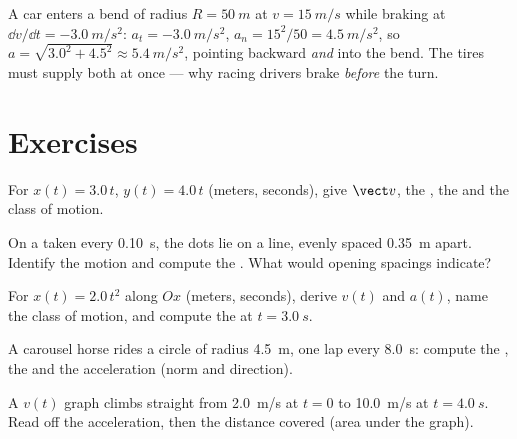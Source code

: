 \begin{example}\label{ex:g12:kinematics-2d:bend}
A car enters a bend of radius $R = \qty{50}{m}$ at $v = \qty{15}{m/s}$
while braking at $\dd v/\dd t = \qty{-3.0}{m/s^2}$: $a_t =
\qty{-3.0}{m/s^2}$, $a_n = 15^2/50 = \qty{4.5}{m/s^2}$, so $a =
\sqrt{3.0^2 + 4.5^2} \approx \qty{5.4}{m/s^2}$, pointing backward
\emph{and} into the bend. The tires must supply both at once ---
why racing drivers brake \emph{before} the turn.
\end{example}

\section{Exercises}

\begin{exercise}[$\star$]\label{exo:g12:kinematics-2d:1}
For $x(t) = 3.0\,t$, $y(t) = 4.0\,t$ (meters, seconds), give
$\vect v$, the , the  and the class of motion.
\end{exercise}

\begin{exercise}[$\star$]\label{exo:g12:kinematics-2d:2}
On a  taken every \qty{0.10}{s}, the dots lie on a
line, evenly spaced \qty{0.35}{m} apart. Identify the motion and
compute the . What would opening spacings indicate?
\end{exercise}

\begin{exercise}[$\star$]\label{exo:g12:kinematics-2d:3}
For $x(t) = 2.0\,t^2$ along $Ox$ (meters, seconds), derive $v(t)$
and $a(t)$, name the class of motion, and compute the  at
$t = \qty{3.0}{s}$.
\end{exercise}

\begin{exercise}[$\star$]\label{exo:g12:kinematics-2d:4}
A carousel horse rides a circle of radius \qty{4.5}{m}, one lap every
\qty{8.0}{s}: compute the , the  and the acceleration
(norm and direction).
\end{exercise}

\begin{exercise}[$\star$]\label{exo:g12:kinematics-2d:5}
A $v(t)$ graph climbs straight from \qty{2.0}{m/s} at $t = 0$ to
\qty{10.0}{m/s} at $t = \qty{4.0}{s}$. Read off the acceleration,
then the distance covered (area under the graph).
\end{exercise}

